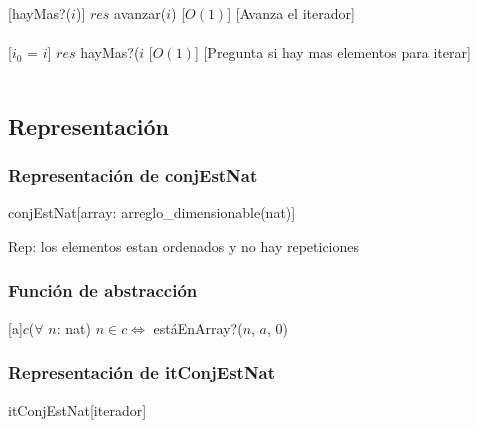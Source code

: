   [hayMas?($i$)]
  {$res$ \igobs avanzar($i$)}
  [$O(1)$]
  [Avanza el iterador]\\\\
  
  [$i_{0}$ = $i$]
  {$res$ \igobs hayMas?($i$}
  [$O(1)$]
  [Pregunta si hay mas elementos para iterar]\\\\
\subsection{Representaci\'on}
\subsubsection{Representaci\'on de conjEstNat}
\begin{Estructura}{conjEstNat}[array: arreglo\_dimensionable(nat)]\end{Estructura}
 	Rep: los elementos estan ordenados y no hay repeticiones
  \subsubsection{Funci\'on de abstracci\'on}
 	
 	[a]{$c$}{($\forall$ $n$: nat) $n \in c \Leftrightarrow$ est\'aEnArray?($n$, $a$, 0)}
 	
 	
\subsubsection{Representaci\'on de itConjEstNat}
\begin{Estructura}{itConjEstNat}[iterador]
	\begin{Tupla}[iterador]
	\end{Tupla}
\end{Estructura}

